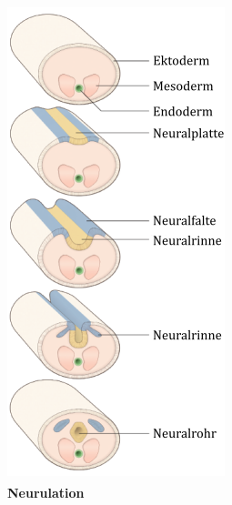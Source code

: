 \documentclass[12pt,a4paper,pdftex]{article}
\begin{document}
\begin{minipage}[b]{0.3\textwidth}
\begin{figure}[H]
    \includegraphics[width=\textwidth]{pictures/Bilder_Jule/Andere/Neurulation_crossm1.png}
    \caption[Neurulation]{\textbf{\newline Neurulation} \textsuperscript{\cite[1]{crossman2014neuroanatomy}}}
    \label{fig:neurulation}
    \end{figure}    
\end{minipage} 
\end{document}

